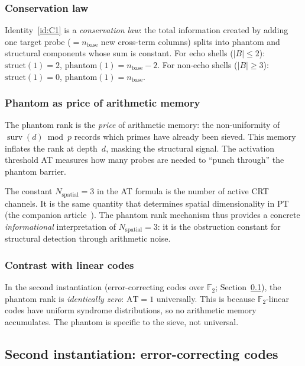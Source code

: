 \documentclass[12pt,a4paper]{article}
\begin{document}
\subsubsection{Conservation law}

Identity~\ref{id:C1} is a \emph{conservation law}: the total information
created by adding one target probe ($= n_{\mathrm{base}}$ new cross-term
columns) splits into phantom and structural components whose sum is constant.
For echo shells ($|B| \le 2$): $\mathrm{struct}(1) = 2$,
$\mathrm{phantom}(1) = n_{\mathrm{base}} - 2$.
For non-echo shells ($|B| \ge 3$): $\mathrm{struct}(1) = 0$,
$\mathrm{phantom}(1) = n_{\mathrm{base}}$.

\subsubsection{Phantom as price of arithmetic memory}

The phantom rank is the \emph{price} of arithmetic memory: the non-uniformity
of $\operatorname{surv}(d) \bmod p$ records which primes have already been
sieved.  This memory inflates the rank at depth~$d$, masking the structural
signal.  The activation threshold AT measures how many probes are needed to
``punch through'' the phantom barrier.

The constant $N_{\mathrm{spatial}} = 3$ in the AT formula is the number of
active CRT channels.  It is the same quantity that determines spatial
dimensionality in PT (the companion article~\cite{companion_M3}).  The phantom rank mechanism
thus provides a concrete \emph{informational} interpretation of
$N_{\mathrm{spatial}} = 3$: it is the obstruction constant for structural
detection through arithmetic noise.

\subsubsection{Contrast with linear codes}

In the second instantiation (error-correcting codes over $\mathbb{F}_2$;
Section~\ref{sec:PM_codes}), the phantom rank is \emph{identically zero}:
$\mathrm{AT} = 1$ universally.  This is because $\mathbb{F}_2$-linear codes
have uniform syndrome distributions, so no arithmetic memory accumulates.  The
phantom is specific to the sieve, not universal.


\subsection{Second instantiation: error-correcting codes}
\label{sec:PM_codes}
\end{document}
